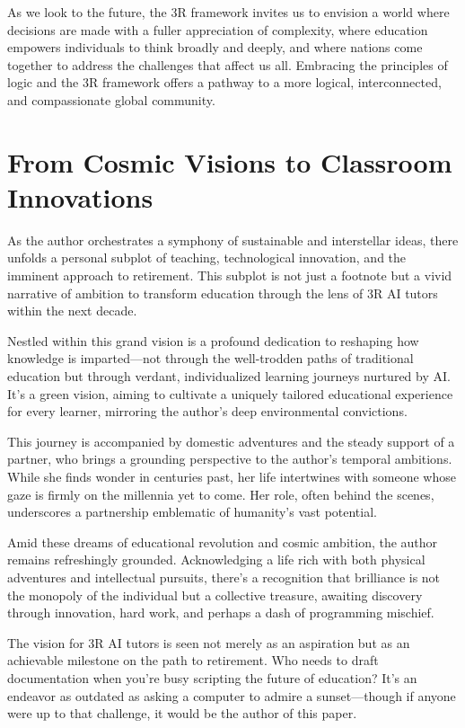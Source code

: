 \documentclass[12pt]{article}
\begin{document}
As we look to the future, the 3R framework invites us to envision a world where decisions are made with a fuller appreciation of complexity, where education empowers individuals to think broadly and deeply, and where nations come together to address the challenges that affect us all. Embracing the principles of \qbit{} logic and the 3R framework offers a pathway to a more logical, interconnected, and compassionate global community.

\section*{From Cosmic Visions to Classroom Innovations}

As the author orchestrates a symphony of sustainable and interstellar ideas, there unfolds a personal subplot of teaching, technological innovation, and the imminent approach to retirement. This subplot is not just a footnote but a vivid narrative of ambition to transform education through the lens of 3R AI tutors within the next decade.

Nestled within this grand vision is a profound dedication to reshaping how knowledge is imparted—not through the well-trodden paths of traditional education but through verdant, individualized learning journeys nurtured by AI. It's a green vision, aiming to cultivate a uniquely tailored educational experience for every learner, mirroring the author's deep environmental convictions.

This journey is accompanied by domestic adventures and the steady support of a partner, who brings a grounding perspective to the author's temporal ambitions. While she finds wonder in centuries past, her life intertwines with someone whose gaze is firmly on the millennia yet to come. Her role, often behind the scenes, underscores a partnership emblematic of humanity’s vast potential.

Amid these dreams of educational revolution and cosmic ambition, the author remains refreshingly grounded. Acknowledging a life rich with both physical adventures and intellectual pursuits, there's a recognition that brilliance is not the monopoly of the individual but a collective treasure, awaiting discovery through innovation, hard work, and perhaps a dash of programming mischief.

The vision for 3R AI tutors is seen not merely as an aspiration but as an achievable milestone on the path to retirement. Who needs to draft documentation when you’re busy scripting the future of education? It’s an endeavor as outdated as asking a computer to admire a sunset—though if anyone were up to that challenge, it would be the author of this paper.
\end{document}
